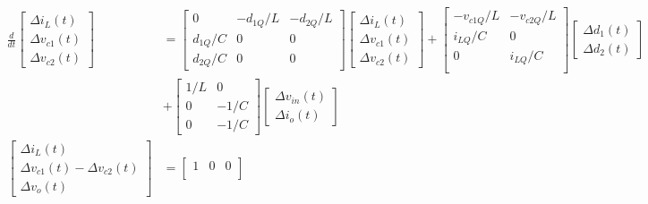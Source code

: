 \begin{align}
\frac{d}{dt}
	\begin{bmatrix}
        	\Delta{i}_{L}(t)\\
        	\Delta{v}_{c1}(t)\\
                \Delta{v}_{c2}(t)
    	\end{bmatrix} &=
    	\begin{bmatrix}
        	0  & -{d}_{1Q}/L & -{d}_{2Q}/L \\
        {d}_{1Q}/C &       0     &      0      \\
        {d}_{2Q}/C &       0     &      0              
    	\end{bmatrix}
    	\begin{bmatrix}
        	\Delta{i}_{L}(t)\\
        	\Delta{v}_{c1}(t)\\
                \Delta{v}_{c2}(t)
    	\end{bmatrix}
    	+
    	\begin{bmatrix}
        	-{v}_{c1Q}/L & -{v}_{c2Q}/L \\
        	 {i}_{LQ}/C  &   0          \\
                       0     &  {i}_{LQ}/C  \\
    	\end{bmatrix}
    	\begin{bmatrix}
        	\Delta{d}_{1}(t) \\
        	\Delta{d}_{2}(t)
    	\end{bmatrix} \nonumber\\
    	&+
    	\begin{bmatrix}
        	1/L &      0 \\
        	 0  &   -1/C \\
                 0  &   -1/C 
    	\end{bmatrix}
    	\begin{bmatrix}
        	\Delta{v}_{in}(t) \\
        	\Delta{i}_{o}(t)
    	\end{bmatrix} \nonumber\\
    	\begin{bmatrix}
        	\Delta{i}_{L}(t)\\
        	\Delta{v}_{c1}(t)-\Delta{v}_{c2}(t)\\
                \Delta{v}_{o}(t)
    	\end{bmatrix} &=
    	\begin{bmatrix}
        	1 & 0 & 0 \\

\end{bmatrix}
\end{align}
